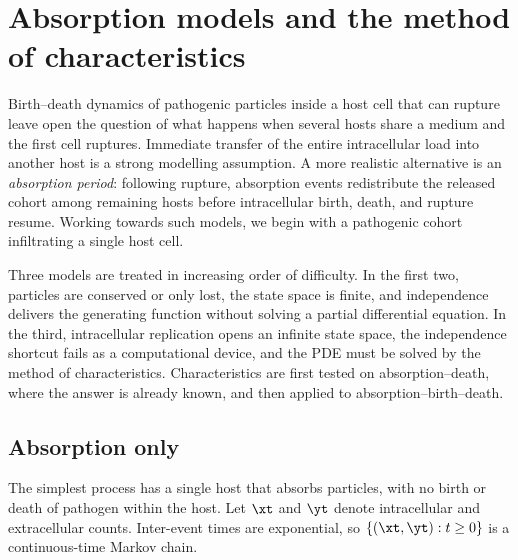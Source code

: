 \section{Absorption models and the method of characteristics}
\label{sec:moc}

Birth--death dynamics of pathogenic particles inside a host cell that can rupture leave open the question of what happens when several hosts share a medium and the first cell ruptures. Immediate transfer of the entire intracellular load into another host is a strong modelling assumption. A more realistic alternative is an \emph{absorption period}: following rupture, absorption events redistribute the released cohort among remaining hosts before intracellular birth, death, and rupture resume. Working towards such models, we begin with a pathogenic cohort infiltrating a single host cell.

Three models are treated in increasing order of difficulty. In the first two, particles are conserved or only lost, the state space is finite, and independence delivers the generating function without solving a partial differential equation. In the third, intracellular replication opens an infinite state space, the independence shortcut fails as a computational device, and the PDE must be solved by the method of characteristics. Characteristics are first tested on absorption--death, where the answer is already known, and then applied to absorption--birth--death.

\subsection{Absorption only}
\label{sec:absonly}

The simplest process has a single host that absorbs particles, with no birth or death of pathogen within the host. Let \(\xt\) and \(\yt\) denote intracellular and extracellular counts. Inter-event times are exponential, so \(\{(\xt,\yt):t\ge0\}\) is a continuous-time Markov chain.


